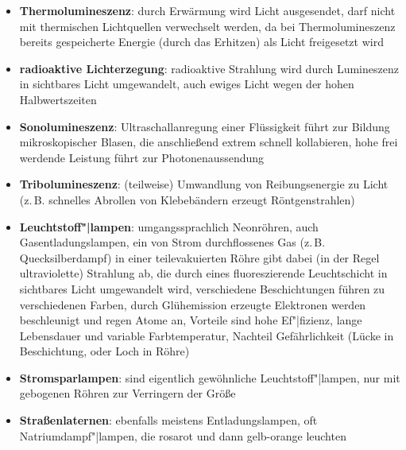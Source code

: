 \begin{itemize}
    \item
    \textbf{Thermolumineszenz}:
    durch Erwärmung wird Licht ausgesendet,
    darf nicht mit thermischen Lichtquellen verwechselt werden,
    da bei Thermolumineszenz bereits gespeicherte Energie (durch das Erhitzen)
    als Licht freigesetzt wird

    \item
    \textbf{radioaktive Lichterzegung}:
    radioaktive Strahlung wird durch Lumineszenz in sichtbares Licht
    umgewandelt,
    auch ewiges Licht wegen der hohen Halbwertszeiten

    \item
    \textbf{Sonolumineszenz}:
    Ultraschallanregung einer Flüssigkeit führt zur Bildung mikroskopischer
    Blasen, die anschließend extrem schnell kollabieren,
    hohe frei werdende Leistung führt zur Photonenaussendung

    \item
    \textbf{Tribolumineszenz}:
    (teilweise) Umwandlung von Reibungsenergie zu Licht
    (z.\,B. schnelles Abrollen von Klebebändern erzeugt Röntgenstrahlen)
\end{itemize}
\linie
\begin{itemize}
    \item
    \textbf{Leuchtstoff"|lampen}:
    umgangssprachlich Neonröhren, auch Gasentladungslampen,
    ein von Strom durchflossenes Gas (z.\,B. Quecksilberdampf) in einer
    teilevakuierten Röhre gibt dabei (in der Regel ultraviolette)
    Strahlung ab,
    die durch eines fluoreszierende Leuchtschicht in sichtbares Licht
    umgewandelt wird,
    verschiedene Beschichtungen führen zu verschiedenen Farben,
    durch Glühemission erzeugte Elektronen werden beschleunigt und
    regen Atome an,
    Vorteile sind hohe Ef"|fizienz, lange Lebensdauer und variable
    Farbtemperatur,
    Nachteil Gefährlichkeit (Lücke in Beschichtung, oder Loch in Röhre)

    \item
    \textbf{Stromsparlampen}:
    sind eigentlich gewöhnliche Leuchtstoff"|lampen, nur mit gebogenen
    Röhren zur Verringern der Größe

    \item
    \textbf{Straßenlaternen}:
    ebenfalls meistens Entladungslampen,
    oft Natriumdampf"|lampen, die rosarot und dann gelb-orange leuchten
\end{itemize}
\linie
\pagebreak
